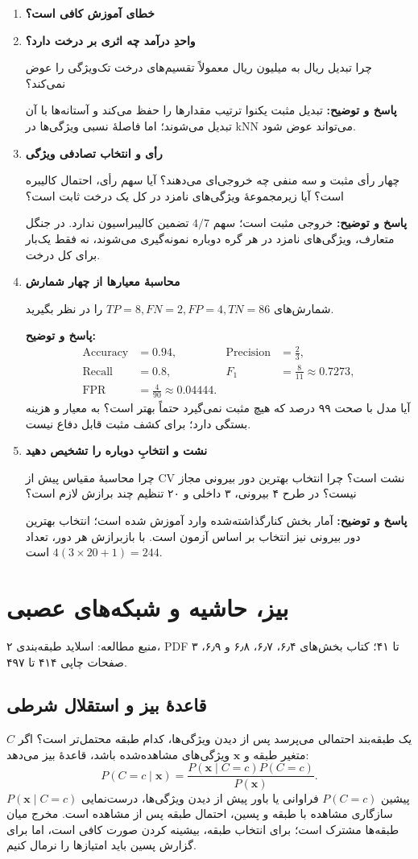 \documentclass[12pt,a4paper,oneside]{report}
\newcounter{ex}[chapter]
\newenvironment{selftests}{\begin{enumerate}\setlength{\itemsep}{9pt}}{\end{enumerate}}
\newenvironment{selftest}[1]{\item\textbf{#1}\par}{\par}
\newcommand{\answer}[1]{\par{\color{teal}\bfseries پاسخ و توضیح: }#1\par}
\newcommand{\source}[1]{\par{\small\color{muted} منبع مطالعه: #1}\par}
\begin{document}
\begin{selftests}
\begin{selftest}{خطای آموزش کافی است؟}
\end{selftest}
\begin{selftest}{واحدِ درآمد چه اثری بر درخت دارد؟}
چرا تبدیل ریال به میلیون ریال معمولاً تقسیم‌های درخت تک‌ویژگی را عوض نمی‌کند؟
\answer{تبدیل مثبت یکنوا ترتیب مقدارها را حفظ می‌کند و آستانه‌ها با آن تبدیل می‌شوند؛ اما فاصلهٔ نسبی ویژگی‌ها در kNN می‌تواند عوض شود.}
\end{selftest}
\begin{selftest}{رأی و انتخاب تصادفی ویژگی}
چهار رأی مثبت و سه منفی چه خروجی‌ای می‌دهند؟ آیا سهم رأی، احتمال کالیبره است؟ آیا زیرمجموعهٔ ویژگی‌های نامزد در کل یک درخت ثابت است؟
\answer{خروجی مثبت است؛ سهم $4/7$ تضمین کالیبراسیون ندارد. در جنگل متعارف، ویژگی‌های نامزد در هر گره دوباره نمونه‌گیری می‌شوند، نه فقط یک‌بار برای کل درخت.}
\end{selftest}
\begin{selftest}{محاسبهٔ معیارها از چهار شمارش}
شمارش‌های $TP=8,FN=2,FP=4,TN=86$ را در نظر بگیرید.
\answer{\begin{align*}
\operatorname{Accuracy}&=0.94,&\operatorname{Precision}&=\frac23,\\
\operatorname{Recall}&=0.8,&F_1&=\frac8{11}\approx0.7273,\\
\operatorname{FPR}&=\frac4{90}\approx0.04444.
\end{align*}
آیا مدل با صحت ۹۹ درصد که هیچ مثبت نمی‌گیرد حتماً بهتر است؟ به معیار و هزینه بستگی دارد؛ برای کشف مثبت قابل دفاع نیست.}
\end{selftest}
\begin{selftest}{نشت و انتخابِ دوباره را تشخیص دهید}
چرا محاسبهٔ مقیاس پیش از CV نشت است؟ چرا انتخاب بهترین دور بیرونی مجاز نیست؟ در طرح ۴ بیرونی، ۳ داخلی و ۲۰ تنظیم چند برازش لازم است؟
\answer{آمار بخش کنارگذاشته‌شده وارد آموزش شده است؛ انتخاب بهترین دور بیرونی نیز انتخاب بر اساس آزمون است. با بازبرازش هر دور، تعداد $4(3\times20+1)=244$ است.}
\end{selftest}
\end{selftests}

\chapter{بیز، حاشیه و شبکه‌های عصبی}
\source{اسلاید طبقه‌بندی ۲، PDF ۳ تا ۴۱؛ کتاب بخش‌های ۶٫۴، ۶٫۷، ۶٫۸ و ۶٫۹، صفحات چاپی ۴۱۴ تا ۴۹۷.}
\section{قاعدهٔ بیز و استقلال شرطی}
یک طبقه‌بند احتمالی می‌پرسد پس از دیدن ویژگی‌ها، کدام طبقه محتمل‌تر است؟ اگر $C$ متغیر طبقه و $\mathbf x$ ویژگی‌های مشاهده‌شده باشد، قاعدهٔ بیز می‌دهد:
\[P(C=c\mid\mathbf x)=\frac{P(\mathbf x\mid C=c)P(C=c)}{P(\mathbf x)}.\]
پیشین $P(C=c)$ فراوانی یا باور پیش از دیدن ویژگی‌ها، درست‌نمایی $P(\mathbf x\mid C=c)$ سازگاری مشاهده با طبقه و پسین، احتمال طبقه پس از مشاهده است. مخرج میان طبقه‌ها مشترک است؛ برای انتخاب طبقه، بیشینه کردن صورت کافی است، اما برای گزارش پسین باید امتیازها را نرمال کنیم.
\end{document}
